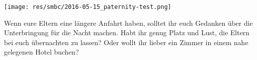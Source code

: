 \begin{multicols}{2}
\begin{center}
	\texttt{[image: res/smbc/2016-05-15\_paternity-test.png]}
\end{center}

Wenn eure Eltern eine längere Anfahrt haben, solltet ihr euch Gedanken über die Unterbringung für die Nacht machen.
Habt ihr genug Platz und Lust, die Eltern bei euch übernachten zu lassen? Oder wollt ihr lieber ein Zimmer in einem nahe gelegenen Hotel buchen?

\end{multicols}

\begin{center}
\end{center}

